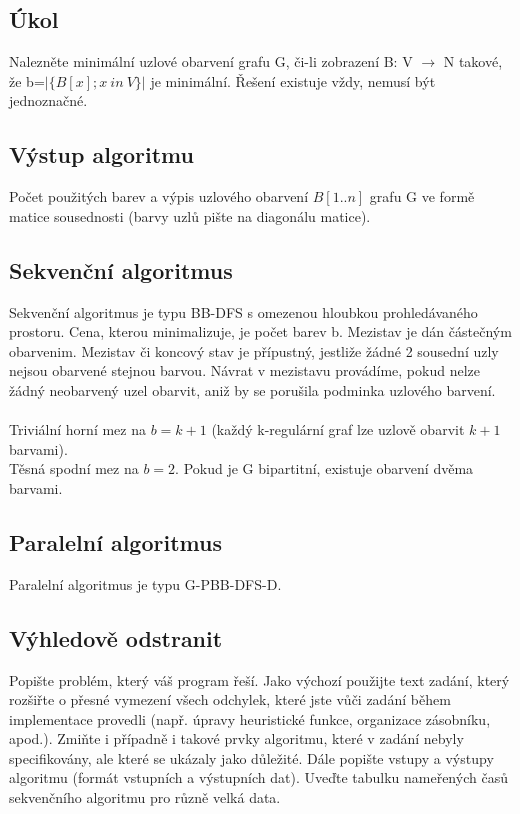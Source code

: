 \documentclass[12pt]{article}
\begin{document}
\subsection{Úkol} 

Nalezněte minimální uzlové obarvení grafu G, či-li zobrazení B: V $\rightarrow$ N takové, že b=$\left|\{B[x]; x\ in\ V\}\right|$ je minimální. Řešení existuje vždy, nemusí být jednoznačné.

\subsection{Výstup algoritmu}

Počet použitých barev a výpis uzlového obarvení $B[1..n]$ grafu G ve formě matice sousednosti (barvy uzlů pište na diagonálu matice).\\

\subsection{Sekvenční algoritmus}

Sekvenční algoritmus je typu BB-DFS s omezenou hloubkou prohledávaného prostoru. Cena, kterou minimalizuje, je počet barev b. Mezistav je dán částečným obarvenim. Mezistav či koncový stav je přípustný, jestliže žádné 2 sousední uzly nejsou obarvené stejnou barvou. Návrat v mezistavu provádíme, pokud nelze žádný neobarvený uzel obarvit, aniž by se porušila podminka uzlového barvení.\\
\\
Triviální horní mez na $b=k+1$ (každý k-regulární graf lze uzlově obarvit $k+1$ barvami).\\
Těsná spodní mez na $b=2$. Pokud je G bipartitní, existuje obarvení dvěma barvami.


\subsection{Paralelní algoritmus}

Paralelní algoritmus je typu G-PBB-DFS-D. 

\subsection{Výhledově odstranit}
Popište problém, který váš program řeší. Jako výchozí použijte text
zadání, který rozšiřte o přesné vymezení všech odchylek, které jste
vůči zadání během implementace provedli (např.  úpravy heuristické
funkce, organizace zásobníku, apod.). Zmiňte i případně i takové
prvky algoritmu, které v zadání nebyly specifikovány, ale které se
ukázaly jako důležité.  Dále popište vstupy a výstupy algoritmu
(formát vstupních a výstupních dat). Uveďte tabulku nameřených časů
sekvenčního algoritmu pro různě velká data.
\end{document}
